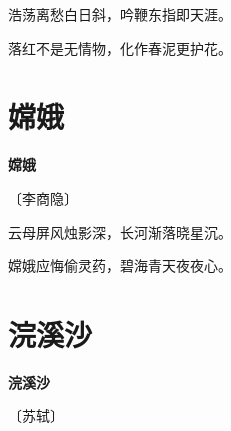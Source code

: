 \documentclass[12pt,UTF-8,openany,fontset=none]{ctexbook}
\begin{document}
\begin{center}
    \begin{Large}

        浩荡离愁白日斜，吟鞭东指即天涯。

        落红不是无情物，化作春泥更护花。

    \end{Large}

\end{center}

\vspace{8pt}
\clearpage

\section{嫦娥}


\begin{center}
    {\bfseries 嫦娥}

    \vspace{18pt}

    \begin{large}\xuwen
        〔李商隐〕
    \end{large}

\end{center}

    \vspace{18pt}  %

\begin{center}
    \begin{Large}

        云母屏风烛影深，长河渐落晓星沉。

        嫦娥应悔偷灵药，碧海青天夜夜心。

    \end{Large}

\end{center}

\vspace{8pt}
\clearpage

\section{浣溪沙}


\begin{center}
    {\bfseries 浣溪沙}

    \vspace{18pt}

    \begin{large}\xuwen
        〔苏轼〕
    \end{large}

\end{center}
\end{document}
